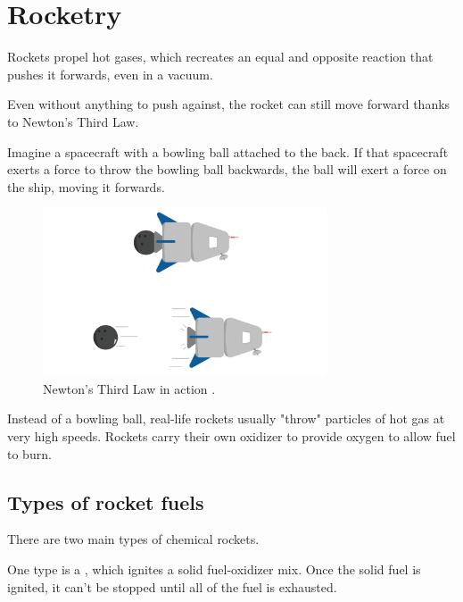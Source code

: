 \chapter{Rocketry}

Rockets propel hot gases, which recreates an equal and opposite reaction that pushes it forwards, even in a vacuum. 

Even without anything to push against, the rocket can still move forward thanks to Newton's Third Law. 

Imagine a spacecraft with a bowling ball attached to the back. If that spacecraft exerts a force to throw the bowling ball backwards, the ball will exert a force on the ship, moving it forwards. 

\begin{figure}[htbp]
    \centering
	\includegraphics[width=0.75\textwidth]{thirdLaw.png}
    \caption{Newton's Third Law in action .}
    \label{fig:example}
\end{figure}


Instead of a bowling ball, real-life rockets usually "throw" particles of hot gas at very high speeds. Rockets carry their own oxidizer to provide oxygen to allow fuel to burn. 

\section{Types of rocket fuels}

There are two main types of chemical rockets. 

One type is a , which ignites a solid fuel-oxidizer mix. Once the solid fuel is ignited, it can't be stopped until all of the fuel is exhausted.

